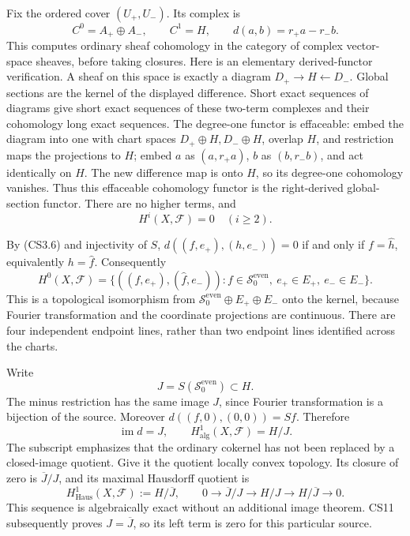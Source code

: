 Fix the ordered cover \((U_+,U_-)\). Its complex is \[
C^0=A_+\oplus A_-,\qquad C^1=H,\qquad
d(a,b)=r_+a-r_-b.
\tag{CS5.1}
\] This computes ordinary sheaf cohomology in the category of complex
vector-space sheaves, before taking closures. Here is an elementary
derived-functor verification. A sheaf on this space is exactly a diagram
\(D_+\to H\leftarrow D_-\). Global sections are the kernel of the
displayed difference. Short exact sequences of diagrams give short exact
sequences of these two-term complexes and their cohomology long exact
sequences. The degree-one functor is effaceable: embed the diagram into
one with chart spaces \(D_+\oplus H,D_-\oplus H\), overlap \(H\), and
restriction maps the projections to \(H\); embed \(a\) as \((a,r_+a)\),
\(b\) as \((b,r_-b)\), and act identically on \(H\). The new difference
map is onto \(H\), so its degree-one cohomology vanishes. Thus this
effaceable cohomology functor is the right-derived global-section
functor. There are no higher terms, and \[
H^i(X,\mathscr F)=0\quad(i\ge2).
\tag{CS5.2}
\]

By (CS3.6) and injectivity of \(S\), \(d((f,e_+),(h,e_-))=0\) if and
only if \(f=\widehat h\), equivalently \(h=\widehat f\). Consequently \[
\boxed{
H^0(X,\mathscr F)
=\{((f,e_+),(\widehat f,e_-)):
f\in\mathcal S_0^{\mathrm{even}},\ e_+\in E_+,\ e_-\in E_-\}.
}
\tag{CS5.3}
\] This is a topological isomorphism from
\(\mathcal S_0^{\mathrm{even}}\oplus E_+\oplus E_-\) onto the kernel,
because Fourier transformation and the coordinate projections are
continuous. There are four independent endpoint lines, rather than two
endpoint lines identified across the charts.

Write \[
J=S(\mathcal S_0^{\mathrm{even}})\subset H.
\tag{CS5.4}
\] The minus restriction has the same image \(J\), since Fourier
transformation is a bijection of the source. Moreover
\(d((f,0),(0,0))=Sf\). Therefore \[
\operatorname{im}d=J,\qquad
\boxed{H^1_{\mathrm{alg}}(X,\mathscr F)=H/J.}
\tag{CS5.5}
\] The subscript emphasizes that the ordinary cokernel has not been
replaced by a closed-image quotient. Give it the quotient locally convex
topology. Its closure of zero is \(\overline J/J\), and its maximal
Hausdorff quotient is \[
H^1_{\mathrm{Haus}}(X,\mathscr F):=
H/\overline J,\qquad
0\longrightarrow\overline J/J
\longrightarrow H/J
\longrightarrow H/\overline J
\longrightarrow0.
\tag{CS5.6}
\] This sequence is algebraically exact without an additional image
theorem. CS11 subsequently proves \(J=\overline J\), so its left term is
zero for this particular source.

